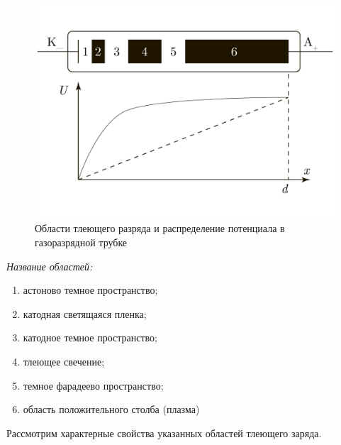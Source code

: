 \documentclass[a4paper, 12pt]{article}
\begin{document}
	\begin{figure}[h]
		\centering
		\includegraphics[scale=0.4]{Graph7.pdf}
		\caption{Области тлеющего разряда и распределение потенциала в газоразрядной трубке}
		\label{fig:Graph7}
	\end{figure}
	\textit{Название областей:}
	\begin{enumerate}
		\item астоново темное пространство;
		\item катодная светящаяся пленка;
		\item катодное темное пространство;
		\item тлеющее свечение;
		\item темное фарадеево пространство;
		\item область положительного столба (плазма)
	\end{enumerate}
	\par
	Рассмотрим характерные свойства указанных областей тлеющего заряда.
\end{document}
